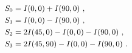  \begin{subequations}\label{Eq:cStokesmeas}
 \small
 	\begin{align}
 	S_{0} & =  I(0, 0) + I(90,0)~, \\
 	S_{1} & =  I(0,0) - I(90,0)~, \\
 	S_{2} & = 2I(45,0)-I(0,0)-I(90,0)~,\\
 	S_{3} & = 2I(45,90) - I(0,0) -I(90,0)~. 
	\end{align} 
 \end{subequations}



